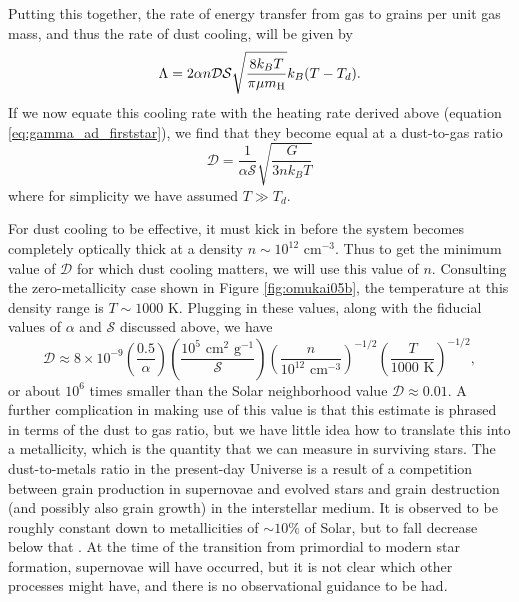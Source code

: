 Putting this together, the rate of energy transfer from gas to grains per unit gas mass, and thus the rate of dust cooling, will be given by
\begin{equation}
\Lambda = 2 \alpha n \mathcal{D} \mathcal{S} \sqrt{\frac{8 k_B T}{\pi \mu m_{\rm H}}} k_B (T-T_d).
\end{equation}
If we now equate this cooling rate with the heating rate derived above (equation \ref{eq:gamma_ad_firststar}), we find that they become equal at a dust-to-gas ratio
\begin{equation}
\mathcal{D} = \frac{1}{\alpha \mathcal{S}} \sqrt{\frac{G}{3 n k_B T}}
\end{equation}
where for simplicity we have assumed $T \gg T_d$.

For dust cooling to be effective, it must kick in before the system becomes completely optically thick at a density $n\sim 10^{12}$ cm$^{-3}$. Thus to get the minimum value of $\mathcal{D}$ for which dust cooling matters, we will use this value of $n$. Consulting the zero-metallicity case shown in Figure \ref{fig:omukai05b}, the temperature at this density range is $T\sim 1000$ K. Plugging in these values, along with the fiducial values of $\alpha$ and $\mathcal{S}$ discussed above, we have
\begin{equation}
\mathcal{D} \approx 8\times 10^{-9}\left(\frac{0.5}{\alpha}\right)
\left(\frac{10^5\mbox{ cm}^2\mbox{ g}^{-1}}{\mathcal{S}}\right)
\left(\frac{n}{10^{12}\mbox{ cm}^{-3}}\right)^{-1/2} \left(\frac{T}{1000\mbox{ K}}\right)^{-1/2},
\end{equation}
or about $10^6$ times smaller than the Solar neighborhood value $\mathcal{D} \approx 0.01$. A further complication in making use of this value is that this estimate is phrased in terms of the dust to gas ratio, but we have little idea how to translate this into a metallicity, which is the quantity that we can measure in surviving stars. The dust-to-metals ratio in the present-day Universe is a result of a competition between grain production in supernovae and evolved stars and grain destruction (and possibly also grain growth) in the interstellar medium. It is observed to be roughly constant down to metallicities of $\sim 10\%$ of Solar, but to fall decrease below that \citep{remy-ruyer14a}. At the time of the transition from primordial to modern star formation, supernovae will have occurred, but it is not clear which other processes might have, and there is no observational guidance to be had.


